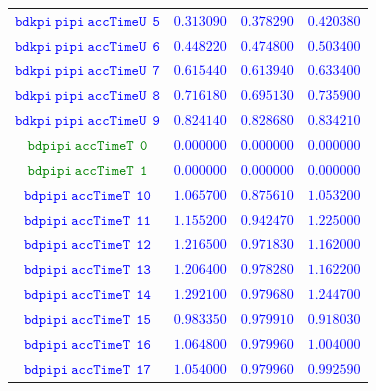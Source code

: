 \documentclass[10pt,a4paper]{article}
\begin{document}
\begin{table}[h!]
{\begin{tabular}{cccc}
\textcolor{blue}{$\mathtt{bdkpi~pipi~accTimeU~~5}$} & \textcolor{blue}{$0.313090$}& \textcolor{blue}{$0.378290$}& \textcolor{blue}{$0.420380$}\\
\textcolor{blue}{$\mathtt{bdkpi~pipi~accTimeU~~6}$} & \textcolor{blue}{$0.448220$}& \textcolor{blue}{$0.474800$}& \textcolor{blue}{$0.503400$}\\
\textcolor{blue}{$\mathtt{bdkpi~pipi~accTimeU~~7}$} & \textcolor{blue}{$0.615440$}& \textcolor{blue}{$0.613940$}& \textcolor{blue}{$0.633400$}\\
\textcolor{blue}{$\mathtt{bdkpi~pipi~accTimeU~~8}$} & \textcolor{blue}{$0.716180$}& \textcolor{blue}{$0.695130$}& \textcolor{blue}{$0.735900$}\\
\textcolor{blue}{$\mathtt{bdkpi~pipi~accTimeU~~9}$} & \textcolor{blue}{$0.824140$}& \textcolor{blue}{$0.828680$}& \textcolor{blue}{$0.834210$}\\
\textcolor{Green}{$\mathtt{bdpipi~accTimeT~~0}$} & \textcolor{blue}{$0.000000$}& \textcolor{blue}{$0.000000$}& \textcolor{blue}{$0.000000$}\\
\textcolor{Green}{$\mathtt{bdpipi~accTimeT~~1}$} & \textcolor{blue}{$0.000000$}& \textcolor{blue}{$0.000000$}& \textcolor{blue}{$0.000000$}\\
\textcolor{blue}{$\mathtt{bdpipi~accTimeT~~10}$} & \textcolor{blue}{$1.065700$}& \textcolor{blue}{$0.875610$}& \textcolor{blue}{$1.053200$}\\
\textcolor{blue}{$\mathtt{bdpipi~accTimeT~~11}$} & \textcolor{blue}{$1.155200$}& \textcolor{blue}{$0.942470$}& \textcolor{blue}{$1.225000$}\\
\textcolor{blue}{$\mathtt{bdpipi~accTimeT~~12}$} & \textcolor{blue}{$1.216500$}& \textcolor{blue}{$0.971830$}& \textcolor{blue}{$1.162000$}\\
\textcolor{blue}{$\mathtt{bdpipi~accTimeT~~13}$} & \textcolor{blue}{$1.206400$}& \textcolor{blue}{$0.978280$}& \textcolor{blue}{$1.162200$}\\
\textcolor{blue}{$\mathtt{bdpipi~accTimeT~~14}$} & \textcolor{blue}{$1.292100$}& \textcolor{blue}{$0.979680$}& \textcolor{blue}{$1.244700$}\\
\textcolor{blue}{$\mathtt{bdpipi~accTimeT~~15}$} & \textcolor{blue}{$0.983350$}& \textcolor{blue}{$0.979910$}& \textcolor{blue}{$0.918030$}\\
\textcolor{blue}{$\mathtt{bdpipi~accTimeT~~16}$} & \textcolor{blue}{$1.064800$}& \textcolor{blue}{$0.979960$}& \textcolor{blue}{$1.004000$}\\
\textcolor{blue}{$\mathtt{bdpipi~accTimeT~~17}$} & \textcolor{blue}{$1.054000$}& \textcolor{blue}{$0.979960$}& \textcolor{blue}{$0.992590$}\\

\end{tabular}}
\end{table}
\end{document}
